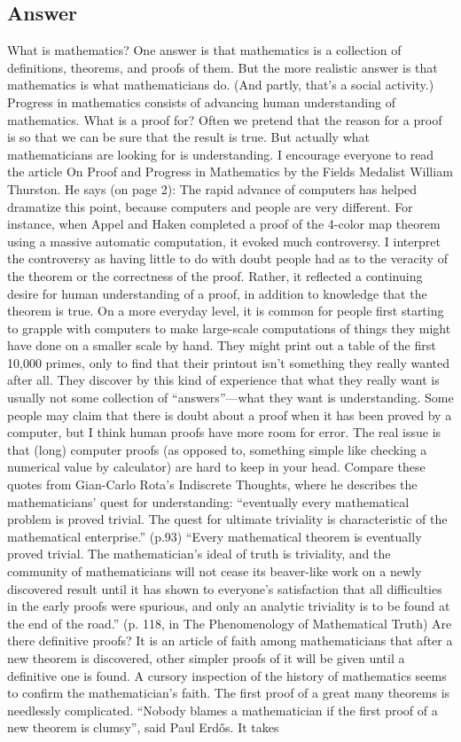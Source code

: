 \documentclass{article}
\begin{document}
\subsection*{Answer}
What is mathematics? One answer is that mathematics is a collection of definitions, theorems, and proofs of them. But the more realistic answer is that mathematics is what mathematicians do. (And partly, that's a social activity.) Progress in mathematics consists of advancing human understanding of mathematics. What is a proof for? Often we pretend that the reason for a proof is so that we can be sure that the result is true. But actually what mathematicians are looking for is understanding. I encourage everyone to read the article On Proof and Progress in Mathematics by the Fields Medalist William Thurston. He says (on page 2): The rapid advance of computers has helped dramatize this point, because computers and people are very different. For instance, when Appel and Haken completed a proof of the 4-color map theorem using a massive automatic computation, it evoked much controversy. I interpret the controversy as having little to do with doubt people had as to the veracity of the theorem or the correctness of the proof. Rather, it reflected a continuing desire for human understanding of a proof, in addition to knowledge that the theorem is true. On a more everyday level, it is common for people first starting to grapple with computers to make large-scale computations of things they might have done on a smaller scale by hand. They might print out a table of the first 10,000 primes, only to find that their printout isn’t something they really wanted after all. They discover by this kind of experience that what they really want is usually not some collection of “answers”—what they want is understanding. Some people may claim that there is doubt about a proof when it has been proved by a computer, but I think human proofs have more room for error. The real issue is that (long) computer proofs (as opposed to, something simple like checking a numerical value by calculator) are hard to keep in your head. Compare these quotes from Gian-Carlo Rota's Indiscrete Thoughts, where he describes the mathematicians' quest for understanding: “eventually every mathematical problem is proved trivial. The quest for ultimate triviality is characteristic of the mathematical enterprise.” (p.93) “Every mathematical theorem is eventually proved trivial. The mathematician’s ideal of truth is triviality, and the community of mathematicians will not cease its beaver-like work on a newly discovered result until it has shown to everyone’s satisfaction that all difficulties in the early proofs were spurious, and only an analytic triviality is to be found at the end of the road.” (p. 118, in The Phenomenology of Mathematical Truth) Are there definitive proofs? It is an article of faith among mathematicians that after a new theorem is discovered, other simpler proofs of it will be given until a definitive one is found. A cursory inspection of the history of mathematics seems to confirm the mathematician’s faith. The first proof of a great many theorems is needlessly complicated. “Nobody blames a mathematician if the first proof of a new theorem is clumsy”, said Paul Erdős. It takes 
\end{document}
